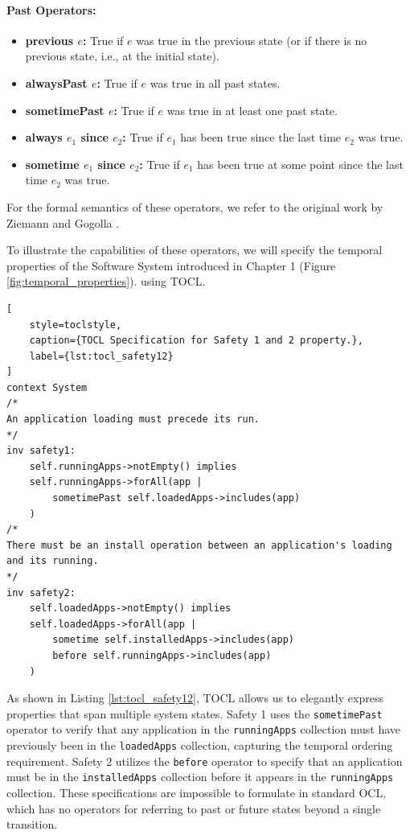 \paragraph{Past Operators:} \begin{itemize} 
    \item \textbf{previous $e$:} True if $e$ was true in the previous state (or if there is no previous state, i.e., at the initial state). 
    \item \textbf{alwaysPast $e$:} True if $e$ was true in all past states. 
    \item \textbf{sometimePast $e$:} True if $e$ was true in at least one past state. 
    \item \textbf{always $e_1$ since $e_2$:} True if $e_1$ has been true since the last time $e_2$ was true. 
    \item \textbf{sometime $e_1$ since $e_2$:} True if $e_1$ has been true at some point since the last time $e_2$ was true. 
\end{itemize}
For the formal semantics of these operators, we refer to the original work by Ziemann and Gogolla \cite{TOCL}.

To illustrate the capabilities of these operators, we will specify the temporal 
properties of the Software System introduced in Chapter 1 (Figure \ref{fig:temporal_properties}).
using TOCL.
\begin{lstlisting}[
    style=toclstyle, 
    caption={TOCL Specification for Safety 1 and 2 property.}, 
    label={lst:tocl_safety12}
]
context System 
/*
An application loading must precede its run.
*/
inv safety1: 
    self.runningApps->notEmpty() implies 
    self.runningApps->forAll(app | 
        sometimePast self.loadedApps->includes(app)
    )
/*
There must be an install operation between an application's loading and its running.
*/
inv safety2: 
    self.loadedApps->notEmpty() implies 
    self.loadedApps->forAll(app | 
        sometime self.installedApps->includes(app) 
        before self.runningApps->includes(app)
    )
\end{lstlisting}
As shown in Listing \ref{lst:tocl_safety12}, TOCL allows us to elegantly express 
properties that span multiple system states. Safety 1 uses the \texttt{sometimePast} 
operator to verify that any application in the \texttt{runningApps} collection must 
have previously been in the \texttt{loadedApps} collection, capturing the temporal 
ordering requirement. Safety 2 utilizes the \texttt{before} operator to specify that 
an application must be in the \texttt{installedApps} collection before it appears 
in the \texttt{runningApps} collection. These specifications are impossible to 
formulate in standard OCL, which has no operators for referring to past or future 
states beyond a single transition.

